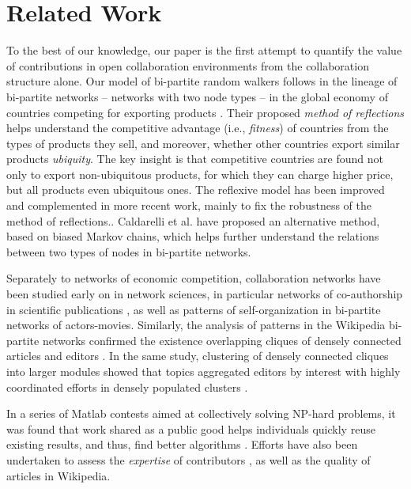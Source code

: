 \section{Related Work}
To the best of our knowledge, our paper is the first attempt to quantify the value of contributions in open collaboration environments from the collaboration structure alone. Our model of {bi-partite random walkers} follows in the lineage of bi-partite networks -- networks with two node types -- in the global economy of countries competing for exporting products \cite{hidalgo2007,hidalgo2009}. Their proposed {\it method of reflections} helps understand the competitive advantage (i.e., {\it fitness}) of countries from the types of products they sell, and moreover, whether other countries export similar products {\it ubiquity}. The key insight is that competitive countries are found not only to export non-ubiquitous products, for which they can charge higher price, but all products even ubiquitous ones. The reflexive model has been improved and complemented in more recent work, mainly to fix the robustness of the method of reflections.\cite{tacchella2012new, cristelli2012competitors, tacchella2013economic, cristelli2013measuring}. Caldarelli et al. \cite{caldarelli2012network} have proposed an alternative method, based on biased Markov chains, which helps further understand the relations between two types of nodes in bi-partite networks. 

Separately to networks of economic competition, collaboration networks have been studied early on in network sciences, in particular networks of co-authorship in scientific publications \cite{newman2001}, as well as patterns of self-organization in bi-partite networks of actors-movies\cite{ramasco2004self}. Similarly, the analysis of patterns in the Wikipedia bi-partite networks confirmed the existence overlapping cliques of densely connected articles and editors  \cite{jesus2009}. In the same study, clustering of densely connected cliques into larger modules \cite{guimera2007module} showed that topics aggregated editors by interest with highly coordinated efforts in densely populated clusters \cite{jesus2009}.

In a series of Matlab contests aimed at collectively solving NP-hard problems, it was found that work shared as a public good helps individuals quickly reuse existing results, and thus, find better algorithms \cite{gulley2010}. Efforts have also been undertaken to assess the {\it expertise} of contributors \cite{geiger2013}, as well as the quality of articles \cite{wang2013tell} in Wikipedia.